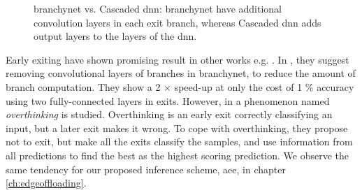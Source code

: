 \begin{figure}
	\hspace{2em}
	\caption[\gls{branchynet} vs. Cascaded \gls{dnn}]{\gls{branchynet} vs. Cascaded \gls{dnn}: \protect{} \gls{branchynet} have additional convolution layers in each exit branch, whereas \protect{} Cascaded \gls{dnn} adds output layers to the layers of the \gls{dnn}.}
	\label{fig:cascaded-vs-branchy}
\end{figure}

Early exiting have shown promising result in other works e.g. \cite{kaya_shallow-deep_nodate, berestizshevsky_sacrificing_2019,panda_conditional_2016}. In \cite{berestizshevsky_sacrificing_2019}, they suggest removing convolutional layers of branches in \gls{branchynet}, to reduce the amount of branch computation. They show a 2 $ \times $ speed-up at only the cost of 1 \% accuracy using two fully-connected layers in exits.
However, in \cite{kaya_shallow-deep_nodate}  a phenomenon named \emph{overthinking} is studied. Overthinking is an early exit correctly classifying an input, but a later exit makes it wrong. To cope with overthinking, they propose not to exit, but make all the exits classify the samples, and use information from all predictions to find the best as the highest scoring prediction. We observe the same tendency for our proposed inference scheme, \gls{aee}, in chapter \ref{ch:edgeoffloading}.

